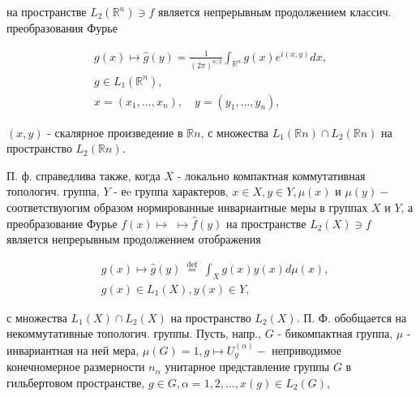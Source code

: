 \documentclass[10pt]{article}
\begin{document}
на пространстве $L_{2}\left(\mathbb{R}^{n}\right) \ni f$ является непрерывным продолжением классич. преобразования Фурье



\[

\begin{gathered}

g(x) \mapsto \hat{g}(y)=\frac{1}{(2 \pi)^{n / 2}} \int_{\mathbb{R}^{n}} g(x) e^{i(x, y)} d x, \\

g \in L_{1}\left(\mathbb{R}^{n}\right), \\

x=\left(x_{1}, \ldots, x_{n}\right), \quad y=\left(y_{1}, \ldots, y_{n}\right),

\end{gathered}

\]



$(x, y)$ - скалярное произведение в $\mathbb{R} n$, с множества $L_{1}(\mathbb{R} n) \cap L_{2}(\mathbb{R} n)$ на пространство $L_{2}(\mathbb{R} n)$.



П. ф. справедлива также, когда $X$ - локально компактная коммутативная топологич. группа, $Y$ - еe группа характеров, $x \in X, y \in Y, \mu(x)$ и $\mu(y)-$ соответствуюгим образом нормированные инвариантные меры в группах $X$ и $Y$, а преобразование Фурье $f(x) \mapsto$ $\mapsto \hat{f}(y)$ на пространстве $L_{2}(X) \ni f$ является непрерывным продолжением отображения



\[

\begin{aligned}

& g(x) \mapsto \hat{g}(y) \stackrel{\text { def }}{=} \int_{X} g(x) y(x) d \mu(x), \\

& g(x) \in L_{1}(X), y(x) \in Y,

\end{aligned}

\]



с множества $L_{1}(X) \cap L_{2}(X)$ на пространство $L_{2}(X)$. П. Ф. обобщается на некоммутативные топологич. группы. Пусть, напр., $G$ - бикомпактная группа, $\mu$ - инвариантная на ней мера, $\mu(G)=1, g \mapsto U_{g}^{(\alpha)}-$ неприводимое конечномерное размерности $n_{\alpha}$ унитарное представление группы $G$ в гильбертовом пространстве, $g \in G, \alpha=1,2, \ldots, x(g) \in L_{2}(G)$,
\end{document}
